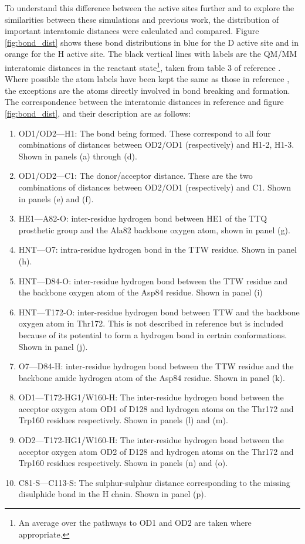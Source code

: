 To understand this difference between the active sites further and to explore the similarities between these simulations and previous work\cite{ranaghanInitioQMMM2017}, the distribution of important interatomic distances were calculated and compared. Figure \ref{fig:bond_dist} shows these bond distributions in blue for the D active site and in orange for the H active site. The black vertical lines with labels are the QM/MM interatomic distances in the reactant state\footnote{An average over the pathways to OD1 and OD2 are taken where appropriate.}, taken from table 3 of reference \cite{ranaghanInitioQMMM2017}. Where possible  the atom labels have been kept the same as those in reference \cite{ranaghanInitioQMMM2017}, the exceptions are the atoms directly involved in bond breaking and formation. The correspondence between the interatomic distances in reference \cite{ranaghanInitioQMMM2017} and figure \ref{fig:bond_dist}, and their description are as follows: 
\begin{enumerate}
    \item OD1/OD2---H1:  The bond being formed. These correspond to all four combinations of distances between OD2/OD1 (respectively) and H1-2, H1-3. Shown in panels (a) through (d). 
    \item OD1/OD2---C1: The donor/acceptor distance. These are the two combinations of distances between OD2/OD1 (respectively) and C1. Shown in panels (e) and (f). 
    \item HE1---A82-O: inter-residue hydrogen bond between HE1 of the TTQ prosthetic group and the Ala82 backbone oxygen atom, shown in panel (g). 
    \item HNT---O7: intra-residue hydrogen bond in the TTW residue. Shown in panel (h).
    \item HNT---D84-O: inter-residue hydrogen bond between the TTW residue and the backbone oxygen atom of the Asp84 residue. Shown in panel (i)
    \item HNT---T172-O: inter-residue hydrogen bond between TTW and the backbone oxygen atom in Thr172. This is not described in reference \cite{ranaghanInitioQMMM2017} but is included because of its potential to form a hydrogen bond in certain conformations. Shown in panel (j). 
    \item O7---D84-H: inter-residue hydrogen bond between the TTW residue and the backbone amide hydrogen atom of the Asp84 residue. Shown in panel (k). 
    \item OD1---T172-HG1/W160-H: The inter-residue hydrogen bond between the acceptor oxygen atom OD1 of D128 and hydrogen atoms on the Thr172 and Trp160 residues respectively. Shown in panels (l) and (m).
    \item OD2---T172-HG1/W160-H: The inter-residue hydrogen bond between the acceptor oxygen atom OD2 of D128 and hydrogen atoms on the Thr172 and Trp160 residues respectively. Shown in panels (n) and (o).\label{o1_t172}
    \item C81-S---C113-S: The sulphur-sulphur distance corresponding to the missing disulphide bond in the H chain. Shown in panel (p). \label{cs_cs} 
\end{enumerate}


